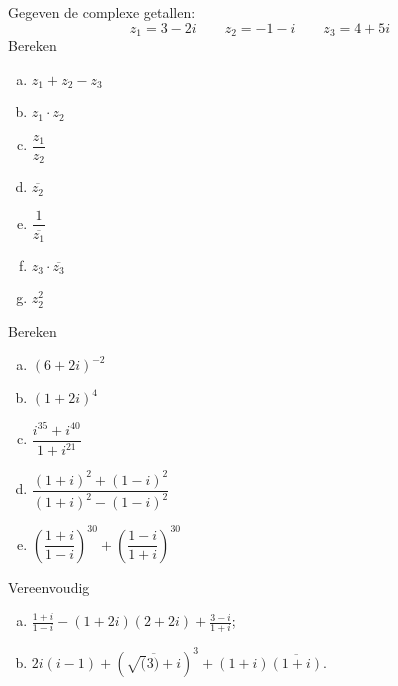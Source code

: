 \documentclass[12pt,twoside]{article}
\begin{document}
\begin{oefening}
  Gegeven de complexe getallen:
  $$z_1=3-2i \qquad z_2=-1-i \qquad z_3=4+5i$$
  Bereken
  \begin{multicols}{2}
    \begin{enumerate}[(a)]
      \itemsep 1em
    \item $\displaystyle z_1+z_2-z_3$
    \item $\displaystyle z_1\cdot z_2$
    \item $\displaystyle \dfrac{z_1}{z_2}$
    \item $\displaystyle \overline{z_2}$
    \item $\displaystyle \dfrac{1}{\overline{z_1}}$
    \item $\displaystyle z_3\cdot \overline{z_3}$
    \item $\displaystyle z_2^2$
    \end{enumerate}
  \end{multicols}
\end{oefening}

\begin{oefening}
  Bereken
  \begin{enumerate}[(a)]
    \itemsep1em
  \item $\displaystyle \left(6+2i\right)^{-2}$
  \item $\displaystyle \left(1+2i\right)^4$
  \item $\displaystyle \dfrac{i^{35}+i^{40}}{1+i^{21}}$
  \item $\displaystyle \dfrac{(1+i)^2+(1-i)^2}{(1+i)^2-(1-i)^2}$
  \item $\displaystyle \left(\dfrac{1+i}{1-i}\right)^{30}+\left(\dfrac{1-i}{1+i}\right)^{30}$
  \end{enumerate}
\end{oefening}

\begin{oefening}
  Vereenvoudig
  \begin{enumerate}[(a)]
    \itemsep 1em
  \item $\frac{1+i}{1-i}-(1+2i)(2+2i)+\frac{3-i}{1+i}$;
  \item $2i(i-1)+\left(\overline{\sqrt(3)+i}\right)^3+(1+i)\overline{(1+i)}.$
  \end{enumerate}
\end{oefening}
\end{document}
